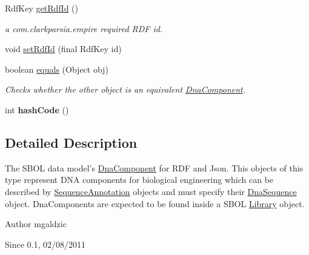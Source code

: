 \begin{DoxyCompactItemize}
RdfKey \hyperlink{classorg_1_1sbolstandard_1_1lib_s_b_o_lj_1_1_dna_component_a2f954d1f82194a78433acc5f73191267}{getRdfId} ()
\begin{DoxyCompactList}\small\item\em a com.clarkparsia.empire required RDF id. \item\end{DoxyCompactList}\item 
void \hyperlink{classorg_1_1sbolstandard_1_1lib_s_b_o_lj_1_1_dna_component_a8995b319c63119db4d42589bd2083b19}{setRdfId} (final RdfKey id)
\item 
boolean \hyperlink{classorg_1_1sbolstandard_1_1lib_s_b_o_lj_1_1_dna_component_a247353c297008cbcd2b134068c9659de}{equals} (Object obj)
\begin{DoxyCompactList}\small\item\em Checks whether the other object is an equivalent \hyperlink{classorg_1_1sbolstandard_1_1lib_s_b_o_lj_1_1_dna_component}{DnaComponent}. \item\end{DoxyCompactList}\item 
\hypertarget{classorg_1_1sbolstandard_1_1lib_s_b_o_lj_1_1_dna_component_af5709fe8231fe8e8005e5a0b175e3324}{
int {\bfseries hashCode} ()}
\label{classorg_1_1sbolstandard_1_1lib_s_b_o_lj_1_1_dna_component_af5709fe8231fe8e8005e5a0b175e3324}

\end{DoxyCompactItemize}


\subsection{Detailed Description}
The SBOL data model's \hyperlink{classorg_1_1sbolstandard_1_1lib_s_b_o_lj_1_1_dna_component}{DnaComponent} for RDF and Json. This objects of this type represent DNA components for biological engineering which can be described by \hyperlink{classorg_1_1sbolstandard_1_1lib_s_b_o_lj_1_1_sequence_annotation}{SequenceAnnotation} objects and must specify their \hyperlink{classorg_1_1sbolstandard_1_1lib_s_b_o_lj_1_1_dna_sequence}{DnaSequence} object. DnaComponents are expected to be found inside a SBOL \hyperlink{classorg_1_1sbolstandard_1_1lib_s_b_o_lj_1_1_library}{Library} object.

\begin{DoxyAuthor}{Author}
mgaldzic 
\end{DoxyAuthor}
\begin{DoxySince}{Since}
0.1, 02/08/2011 
\end{DoxySince}


